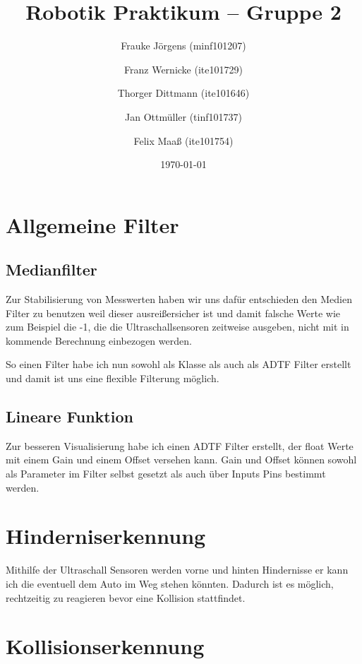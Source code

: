 \documentclass[a4paper,12pt]{report}
\begin{document}
	\title{Robotik Praktikum -- Gruppe 2}
	\author{Frauke Jörgens (minf101207) \and Franz Wernicke (ite101729) \and Thorger Dittmann (ite101646) \and Jan Ottmüller (tinf101737) \and Felix Maaß (ite101754)}
	\date{\today}
	\maketitle
	
	\tableofcontents
	
	
	
	
	\chapter{Allgemeine Filter}
	\section{Medianfilter}
	
		Zur Stabilisierung von Messwerten haben wir uns dafür entschieden den Medien Filter zu benutzen weil dieser ausreißersicher ist und damit falsche Werte wie zum Beispiel die -1, die die Ultraschallsensoren zeitweise ausgeben, nicht mit in kommende Berechnung einbezogen werden.
		
		So einen Filter habe ich nun sowohl als Klasse als auch als ADTF Filter erstellt und damit ist uns eine flexible Filterung möglich.
	
	
	\section{Lineare Funktion}
	
		Zur besseren Visualisierung habe ich einen ADTF Filter erstellt, der float Werte mit einem Gain und einem Offset versehen kann. 
		Gain und Offset können sowohl als Parameter im Filter selbst gesetzt als auch über Inputs Pins bestimmt werden.
	
	\chapter{Hinderniserkennung}
	
		Mithilfe der Ultraschall Sensoren werden vorne und hinten Hindernisse er kann ich die eventuell dem Auto im Weg stehen könnten.
		Dadurch ist es möglich, rechtzeitig zu reagieren bevor eine Kollision stattfindet.
	
	\chapter{Kollisionserkennung}
	
\end{document}
